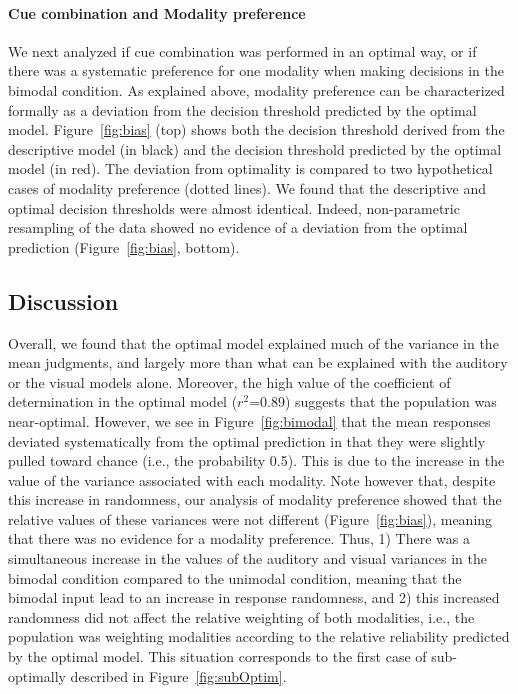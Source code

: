 \documentclass[english,floatsintext,man]{apa6}
\theoremstyle{definition}
\theoremstyle{definition}
\theoremstyle{definition}
\theoremstyle{remark}
\begin{document}
\paragraph{Cue combination and Modality
preference}\label{cue-combination-and-modality-preference}

We next analyzed if cue combination was performed in an optimal way, or
if there was a systematic preference for one modality when making
decisions in the bimodal condition. As explained above, modality
preference can be characterized formally as a deviation from the
decision threshold predicted by the optimal model. Figure~\ref{fig:bias}
(top) shows both the decision threshold derived from the descriptive
model (in black) and the decision threshold predicted by the optimal
model (in red). The deviation from optimality is compared to two
hypothetical cases of modality preference (dotted lines). We found that
the descriptive and optimal decision thresholds were almost identical.
Indeed, non-parametric resampling of the data showed no evidence of a
deviation from the optimal prediction (Figure~\ref{fig:bias}, bottom).

\subsection{Discussion}\label{discussion}

Overall, we found that the optimal model explained much of the variance
in the mean judgments, and largely more than what can be explained with
the auditory or the visual models alone. Moreover, the high value of the
coefficient of determination in the optimal model (\(r^2\)=0.89)
suggests that the population was near-optimal. However, we see in
Figure~\ref{fig:bimodal} that the mean responses deviated systematically
from the optimal prediction in that they were slightly pulled toward
chance (i.e., the probability 0.5). This is due to the increase in the
value of the variance associated with each modality. Note however that,
despite this increase in randomness, our analysis of modality preference
showed that the relative values of these variances were not different
(Figure~\ref{fig:bias}), meaning that there was no evidence for a
modality preference. Thus, 1) There was a simultaneous increase in the
values of the auditory and visual variances in the bimodal condition
compared to the unimodal condition, meaning that the bimodal input lead
to an increase in response randomness, and 2) this increased randomness
did not affect the relative weighting of both modalities, i.e., the
population was weighting modalities according to the relative
reliability predicted by the optimal model. This situation corresponds
to the first case of sub-optimally described in
Figure~\ref{fig:subOptim}.
\end{document}
